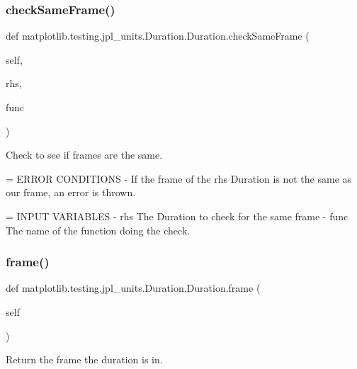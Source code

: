 \subsubsection{\texorpdfstring{check\+Same\+Frame()}{checkSameFrame()}}
{\footnotesize\ttfamily def matplotlib.\+testing.\+jpl\+\_\+units.\+Duration.\+Duration.\+check\+Same\+Frame (\begin{DoxyParamCaption}\item[{}]{self,  }\item[{}]{rhs,  }\item[{}]{func }\end{DoxyParamCaption})}

\begin{DoxyVerb}Check to see if frames are the same.

= ERROR CONDITIONS
- If the frame of the rhs Duration is not the same as our frame,
  an error is thrown.

= INPUT VARIABLES
- rhs     The Duration to check for the same frame
- func    The name of the function doing the check.
\end{DoxyVerb}
 \mbox{\label{classmatplotlib_1_1testing_1_1jpl__units_1_1Duration_1_1Duration_a9d8a16f1df93e65c14ef24979b9d5655}} 
\subsubsection{\texorpdfstring{frame()}{frame()}}
{\footnotesize\ttfamily def matplotlib.\+testing.\+jpl\+\_\+units.\+Duration.\+Duration.\+frame (\begin{DoxyParamCaption}\item[{}]{self }\end{DoxyParamCaption})}

\begin{DoxyVerb}Return the frame the duration is in.\end{DoxyVerb}
 \mbox{\label{classmatplotlib_1_1testing_1_1jpl__units_1_1Duration_1_1Duration_a2570f488a31395e333bf4910becab7b1}} 
